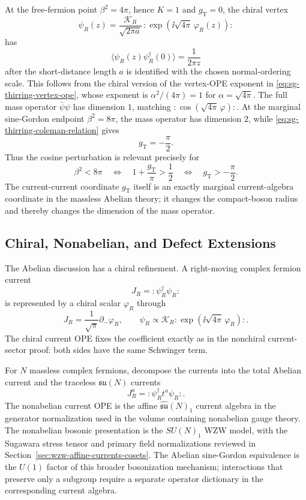 At the free-fermion point \(\beta^2=4\pi\), hence \(K=1\) and
\(g_{\mathrm T}=0\), the chiral vertex
\[
  \psi_R(z)=\frac{\mathcal K_R}{\sqrt{2\pi a}}\,
  :\!\exp(\ii\sqrt{4\pi}\,\varphi_R(z))\!:
\]
has
\[
  \langle\psi_R(z)\psi_R^\dagger(0)\rangle
  =
  \frac{1}{2\pi z}
\]
after the short-distance length \(a\) is identified with the chosen
normal-ordering scale.  This follows from the chiral version of
the vertex-OPE exponent in \eqref{eq:sg-thirring-vertex-ope}, whose exponent is
\(\alpha^2/(4\pi)=1\) for \(\alpha=\sqrt{4\pi}\).  The full mass operator
\(\bar\psi\psi\) has dimension \(1\), matching
\(:\!\cos(\sqrt{4\pi}\,\varphi)\!:\).  At the marginal sine-Gordon endpoint
\(\beta^2=8\pi\), the mass operator has dimension \(2\), while
\eqref{eq:sg-thirring-coleman-relation} gives
\[
  g_{\mathrm T}=-\frac{\pi}{2}.
\]
Thus the cosine perturbation is relevant precisely for
\[
  \beta^2<8\pi
  \quad\Longleftrightarrow\quad
  1+\frac{g_{\mathrm T}}{\pi}>\frac12
  \quad\Longleftrightarrow\quad
  g_{\mathrm T}>-\frac{\pi}{2}.
\]
The current-current coordinate \(g_{\mathrm T}\) itself is an exactly
marginal current-algebra coordinate in the massless Abelian theory; it changes
the compact-boson radius and thereby changes the dimension of the mass
operator.

\subsection{Chiral, Nonabelian, and Defect Extensions}

The Abelian discussion has a chiral refinement.  A right-moving complex
fermion current
\[
  J_R=:\!\psi_R^\dagger\psi_R\!:
\]
is represented by a chiral scalar \(\varphi_R\) through
\[
  J_R=\frac{1}{\sqrt\pi}\partial_-\varphi_R,
  \qquad
  \psi_R\propto \mathcal K_R:\!\exp(\ii\sqrt{4\pi}\,\varphi_R)\!: .
\]
The chiral current OPE fixes the coefficient exactly as in the nonchiral
current-sector proof: both sides have the same Schwinger term.

For \(N\) massless complex fermions, decompose the currents into the total
Abelian current and the traceless \(\mathfrak{su}(N)\) currents
\[
  J^a_R=:\!\psi_R^\dagger t^a\psi_R\!: .
\]
The nonabelian current OPE is the affine \(\widehat{\mathfrak{su}}(N)_1\)
current algebra in the generator normalization used in the volume containing
nonabelian gauge theory.  The nonabelian bosonic presentation is the
\(SU(N)_1\) WZW model, with the Sugawara stress tensor and primary field
normalizations reviewed in
Section~\ref{sec:wzw-affine-currents-cosets}.  The Abelian sine-Gordon
equivalence is the \(U(1)\) factor of this broader bosonization mechanism;
interactions that preserve only a subgroup require a separate operator
dictionary in the corresponding current algebra.

